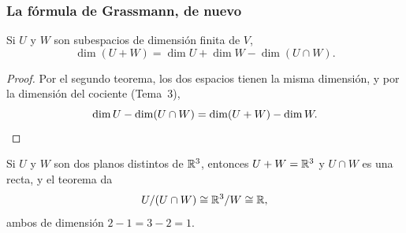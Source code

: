 \begin{frame}[allowframebreaks, t]
    \frametitle{La fórmula de Grassmann, de nuevo}

    \begin{corollary}
        Si $U$ y $W$ son subespacios de dimensión finita de $V$,
        \[
            \dim(U+W)=\dim U+\dim W-\dim(U\cap W).
        \]
    \end{corollary}

    \begin{proof}
        Por el segundo teorema, los dos espacios tienen la misma
        dimensión, y por la dimensión del cociente (Tema~3),
        \[
            \dim U-\dim(U\cap W)=\dim(U+W)-\dim W.\qedhere
        \]
    \end{proof}

    \framebreak

    \begin{example}
        Si $U$ y $W$ son dos planos distintos de $\mathbb{R}^3$, entonces
        $U+W=\mathbb{R}^3$ y $U\cap W$ es una recta, y el teorema da
        \[
            U/(U\cap W)\cong\mathbb{R}^3/W\cong\mathbb{R},
        \]
        ambos de dimensión $2-1=3-2=1$.
    \end{example}
\end{frame}
